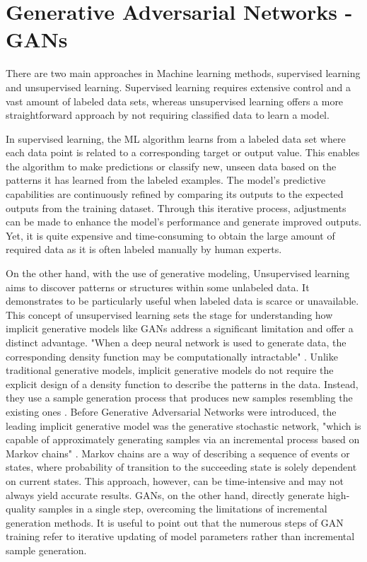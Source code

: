 \section{Generative Adversarial Networks - GANs}
\label{GAN}

There are two main approaches in Machine learning methods, 
supervised learning and unsupervised learning. Supervised learning requires extensive control and a vast amount of labeled data sets, whereas unsupervised learning offers a more straightforward approach by not requiring classified data to learn a model.

In supervised learning, the ML algorithm learns from a labeled data set where each data point is related to a corresponding target or output value. This enables the algorithm to make predictions or classify new, unseen data based on the patterns it has learned from the labeled examples. The model's predictive capabilities are continuously refined by comparing its outputs to the expected outputs from the training dataset. Through this iterative process, adjustments can be made to enhance the model's performance and generate improved outputs. Yet, it is quite expensive and time-consuming to obtain the large amount of required data as it is often labeled manually by human experts.

On the other hand, with the use of generative modeling, Unsupervised learning aims to discover patterns or structures within some unlabeled data. It demonstrates to be particularly useful when labeled data is scarce or unavailable. This concept of unsupervised learning sets the stage for understanding how implicit generative models like GANs address a significant limitation and offer a distinct advantage. "When a deep neural network is used to generate data, the corresponding density function may be computationally intractable" \citep{goodfellowGAN}. Unlike traditional generative models, implicit generative models do not require the explicit design of a density function to describe the patterns in the data. Instead, they use a sample generation process that produces new samples resembling the existing ones \citep{goodfellowGAN}. Before Generative Adversarial Networks were introduced, the leading implicit generative model was the generative stochastic network, "which is capable of approximately generating samples via an incremental process based on Markov chains" \citep{goodfellowGAN}. Markov chains are a way of describing a sequence of events or states, where probability of transition to the succeeding state is solely dependent on current states. This approach, however,  can be time-intensive and may not always yield accurate results. GANs, on the other hand, directly generate high-quality samples in a single step, overcoming the limitations of incremental generation methods. It is useful to point out that the numerous steps of GAN training refer to iterative updating of model parameters rather than incremental sample generation.

